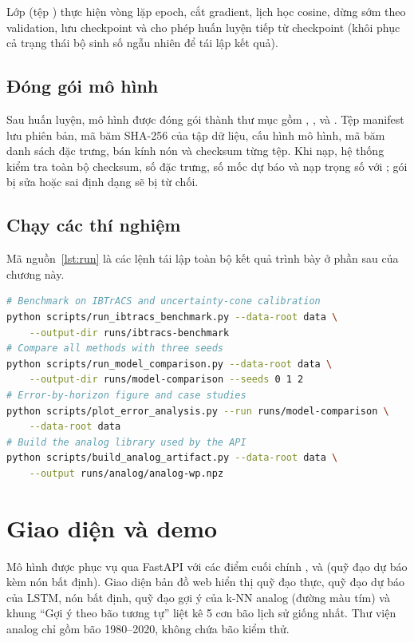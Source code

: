 Lớp  (tệp ) thực hiện
vòng lặp epoch, cắt gradient, lịch học cosine, dừng sớm theo validation, lưu
checkpoint và cho phép huấn luyện tiếp từ checkpoint (khôi phục cả trạng thái
bộ sinh số ngẫu nhiên để tái lập kết quả).

\subsection{Đóng gói mô hình}

Sau huấn luyện, mô hình được đóng gói thành thư mục gồm ,
,  và . Tệp
manifest lưu phiên bản, mã băm SHA-256 của tập dữ liệu, cấu hình mô hình, mã
băm danh sách đặc trưng, bán kính nón và checksum từng tệp. Khi nạp, hệ thống
kiểm tra toàn bộ checksum, số đặc trưng, số mốc dự báo và nạp trọng số với
; gói bị sửa hoặc sai định dạng sẽ bị từ chối.

\subsection{Chạy các thí nghiệm}

Mã nguồn~\ref{lst:run} là các lệnh tái lập toàn bộ kết quả trình bày ở phần
sau của chương này.

\begin{lstlisting}[language=bash, caption={Các lệnh tái lập thí nghiệm.}, label={lst:run}]
# Benchmark on IBTrACS and uncertainty-cone calibration
python scripts/run_ibtracs_benchmark.py --data-root data \
    --output-dir runs/ibtracs-benchmark
# Compare all methods with three seeds
python scripts/run_model_comparison.py --data-root data \
    --output-dir runs/model-comparison --seeds 0 1 2
# Error-by-horizon figure and case studies
python scripts/plot_error_analysis.py --run runs/model-comparison \
    --data-root data
# Build the analog library used by the API
python scripts/build_analog_artifact.py --data-root data \
    --output runs/analog/analog-wp.npz
\end{lstlisting}

\section{Giao diện và demo}

Mô hình được phục vụ qua FastAPI với các điểm cuối chính ,
 và  (quỹ đạo dự báo kèm
nón bất định). Giao diện bản đồ web hiển thị quỹ đạo thực, quỹ đạo dự báo của
LSTM, nón bất định, quỹ đạo gợi ý của k-NN analog (đường màu tím) và khung
``Gợi ý theo bão tương tự'' liệt kê 5 cơn bão lịch sử giống nhất. Thư viện
analog chỉ gồm bão 1980--2020, không chứa bão kiểm thử.

